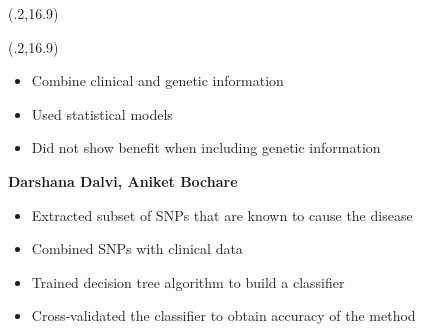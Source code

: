 \documentclass[final]{beamer}
\begin{document}
\begin{frame}{}
\begin{textblock}{23}(.2,16.9)
\begin{block}{\vskip 1in}
\end{block}
\end{textblock}


\begin{textblock}{8.1}(.2,16.9)




\begin{itemize}
\item <1-> Combine clinical and genetic information
\item <1-> Used statistical models
\item <1-> Did not show benefit when including genetic information 

\end{itemize}

\begin{center}{\bf Darshana Dalvi, Aniket Bochare} \end{center}

\begin{itemize}

\item<1-> Extracted subset of SNPs that are known to cause the disease

\item<1-> Combined SNPs with clinical data

\item<1-> Trained decision tree algorithm to build a classifier

\item<1-> Cross-validated the classifier to obtain accuracy of the method


\end{itemize}
\end{textblock}
\end{frame}
\end{document}
